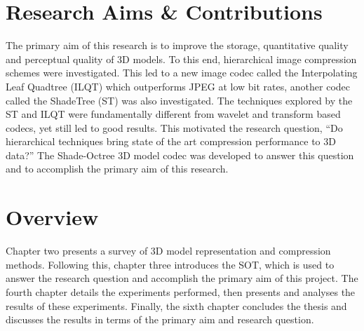 \section{Research Aims \& Contributions}

The primary aim of this research is to improve the storage, quantitative quality and perceptual quality of 3D models. To this end, hierarchical image compression schemes were investigated. This led to a new image codec called the Interpolating Leaf Quadtree (ILQT) \cite{Lincoln13Interpolating} which outperforms JPEG at low bit rates, another codec called the ShadeTree (ST) was also investigated. The techniques explored by the ST and ILQT were fundamentally different from wavelet and transform based codecs, yet still led to good results. This motivated the research question, ``Do hierarchical techniques bring state of the art compression performance to 3D data?'' The Shade-Octree 3D model codec was developed to answer this question and to accomplish the primary aim of this research. 

\section{Overview}

Chapter two presents a survey of 3D model representation and compression methods. Following this, chapter three introduces the SOT, which is used to answer the research question and accomplish the primary aim of this project. The fourth chapter details the experiments performed, then presents and analyses the results of these experiments. Finally, the sixth chapter concludes the thesis and discusses the results in terms of the primary aim and research question. 



